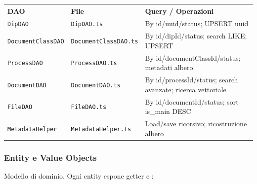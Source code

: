 \begin{table}[H]
  \centering
  \footnotesize
  \setlength{\tabcolsep}{4pt}
  \renewcommand{\arraystretch}{1.5}
  \begin{tabularx}{\textwidth}{|l|l|Y|}
    \hline
    \textbf{DAO} & \textbf{File} & \textbf{Query / Operazioni} \\
    \hline
    \texttt{DipDAO} & \texttt{DipDAO.ts} & 
      By id/uuid/status; UPSERT uuid \\
    \hline
    \texttt{DocumentClassDAO} & \texttt{DocumentClassDAO.ts} & 
      By id/dipId/status; search LIKE; UPSERT \\
    \hline
    \texttt{ProcessDAO} & \texttt{ProcessDAO.ts} & 
      By id/documentClassId/status; metadati albero \\
    \hline
    \texttt{DocumentDAO} & \texttt{DocumentDAO.ts} & 
      By id/processId/status; search avanzate; ricerca vettoriale \\
    \hline
    \texttt{FileDAO} & \texttt{FileDAO.ts} & 
      By id/documentId/status; sort is\_main DESC \\
    \hline
    \texttt{MetadataHelper} & \texttt{MetadataHelper.ts} & 
      Load/save ricorsivo; ricostruzione albero \\
    \hline
  \end{tabularx}
  \label{tab:browsing:daos}
\end{table}

\subsubsection{Entity e Value Objects}
\label{sec:browsing:entity}

\noindent
Modello di dominio. Ogni entity espone getter e :

